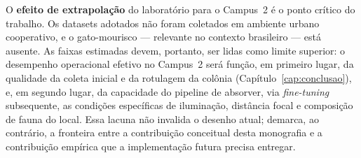 O \textbf{efeito de extrapolação} do laboratório para o Campus~2 é o ponto crítico do trabalho. Os datasets adotados não foram coletados em ambiente urbano cooperativo, e o gato-mourisco --- relevante no contexto brasileiro --- está ausente. As faixas estimadas devem, portanto, ser lidas como limite superior: o desempenho operacional efetivo no Campus~2 será função, em primeiro lugar, da qualidade da coleta inicial e da rotulagem da colônia (Capítulo~\ref{cap:conclusao}), e, em segundo lugar, da capacidade do pipeline de absorver, via \emph{fine-tuning} subsequente, as condições específicas de iluminação, distância focal e composição de fauna do local. Essa lacuna não invalida o desenho atual; demarca, ao contrário, a fronteira entre a contribuição conceitual desta monografia e a contribuição empírica que a implementação futura precisa entregar.
